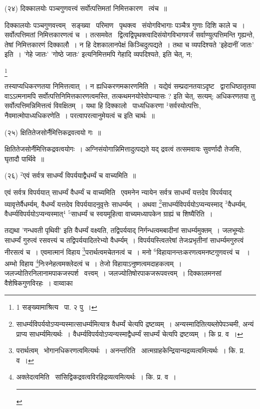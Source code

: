 \documentclass[11pt, openany]{book}
\newcommand\blfootnote[1]{%
 \begingroup
 \renewcommand\thefootnote{}\footnote{#1}%
 \addtocounter{footnote}{-1}%
 \endgroup
}
\begin{document}
\hangindent=2cm {\knu (२४) दिक्कालयोः पञ्चगुणवत्त्वं सर्वोत्पत्तिमतां निमित्तकारण \textendash\ त्वंच~॥}

{\knu दिक्कालयोः पञ्चगुणवत्त्वम्} \textendash\ सङ्ख्या \textendash\ परिमाण \textendash\ पृथक्त्व \textendash\ संयोगविभागाः पञ्चैत्र गुणाः दिशि काले च~। {\knu सर्वोत्पत्तिमतां निमित्तकारणत्वं च~।} तत्समवेत \textendash\ द्वित्वद्विपृथक्त्वादिसंयोगविभागवर्जं सर्वाण्युत्पत्तिमन्ति गृह्यन्ते, तेषां निमित्तकारणं दिक्कालौ~। न हि देशकालानपेक्षं किञ्चिदुत्पद्यते~। तथा च व्यपदिश्यते 'इहेदानीं जातः' इति~। 'गेहे जातः' 'गोष्ठे जातः' इत्यनिमित्तमपि गेहादि व्यपदिश्यते, इति चेत्, न; 

\blfootnote{1 सङ्ख्यामाश्रित्य \textendash\ पा. २ पु~।}

\newpage
\noindent
तस्याप्यधिकरणतया निमित्तत्वात्~। न ह्यधिकरणमकारणमिति~। यद्येवं सम्प्रदानतयाऽदृष्ट \textendash\ द्वाराधिष्ठातृतया वाऽऽत्मनामपि सर्वोत्पत्तिनिमित्तकारणत्वमस्ति, तत्कथमनयोरेवोपन्यासः ? इति चेत्, सत्यम्; अधिकरणतया तु सर्वोत्पत्तिमन्निमित्तत्वं विवक्षितम्~। यथा हि दिक्कालो  \textendash\ पाध्यधिकरणा ${}^1$सर्वस्योत्पत्तिः, नैवमात्मोपाध्यधिकरणेति~। परत्वापरत्वानुमेयत्वं च इति चार्थः~॥

{\knu (२५) क्षितितेजसोर्नैमित्तिकद्रवत्वयो गः~॥}

क्षितितेजसोर्नैमित्तिकद्रवत्वयोगः~। अग्निसंयोगान्निमित्तादुत्पद्यते यद् द्रवत्वं तत्समवायः सुवर्णादौ तेजसि, घृतादौ पार्थिवे~॥

{\knu (२६) ${}^2$एवं सर्वत्र साधर्म्यं विपर्ययाद्वैधर्म्यं च वाच्यमिति~॥}

एवं सर्वत्र विपर्ययात् साधर्म्यं वैधर्म्यं च वाच्यमिति \textendash\ एवमनेन न्यायेन सर्वत्र साधर्म्यं यत्तदेव विपर्ययाद् व्यावृत्तेर्वैधर्म्यम्, वैधर्म्यं यत्तदेव विपर्ययादनुवृत्तेः साधर्म्यम्~। अथवा \renewcommand{\thefootnote}{१}\footnote{साधर्म्यविपर्ययोऽप्यन्यस्मात्साधर्म्यमित्यात्र वैधर्म्यं चेत्यपि द्रष्टव्यम्~। अन्यस्मादितित्यब्लोपेपञ्चमी, अन्यं प्राप्य साधर्म्यमित्यर्थः~। वैधर्म्यविपर्ययोऽप्यन्यस्माद्वैधर्म्यं साधर्म्यं चेत्यपि द्रष्टव्यम्~। कि प्र. व~।}साधर्म्यविपर्ययोऽप्यन्यस्माद् ${}^3$वैधर्म्यम्, वैधर्म्यविपर्ययोऽप्यन्यस्मात्$^4$ ${}^5$साधर्म्यं च स्वयमूहित्वा वाच्यमध्यापकेन ग्राह्यं च शिष्यैरिति~।

तद्यथा 'गन्धवती पृथिवी' इति वैधर्म्यं वक्ष्यति, तद्विपर्ययाद् निर्गन्धत्वमबादीनां साधर्म्यमुक्तम्~। जलभूम्योः साधर्म्यं गुरुत्वं रसवत्त्यं च तद्विपर्ययादितरेभ्यो वैधर्म्यम्~। विपर्ययस्त्वितरेषां तेजःप्रभृतीनां साधर्म्यमगुरुत्वं नीरसत्वं च~। एवमात्मानं विहाय \renewcommand{\thefootnote}{२}\footnote{परार्थत्वम् \textendash\ भोगानधिकरणत्वमित्यर्थः~। अनन्तरिति \textendash\ आत्मग्राहकेन्द्रियान्यद्रव्यत्वमित्यर्थः~। कि. प्र. व~।}परार्थत्वमचेतनत्वं च~। मनो ${}^6$विहायानन्तःकरणत्वमनष्टगुणवत्त्वं च ~। अम्भो विहाय \renewcommand{\thefootnote}{३}\footnote{अक्लेदत्वमिति \textendash\ सांसिद्विकद्रवत्वविरहिद्रव्यत्वमित्यर्थः~। कि. प्र. व~।\\ \rule{0.4\linewidth}{0.5pt}}निःस्नेहत्वमक्लेदत्वं च~। तेजो विहायाऽनुष्णत्वमदाहकत्वम्~। जलज्योतिरनिलानामपाकजस्पर्श \textendash\ वत्त्वम्~। जलज्योतिषोरपाकजरूपवत्त्वम्~। दिक्कालमनसां वैशेषिकगुणविरहः~। वाय्वाका \textendash\ 
\end{document}

